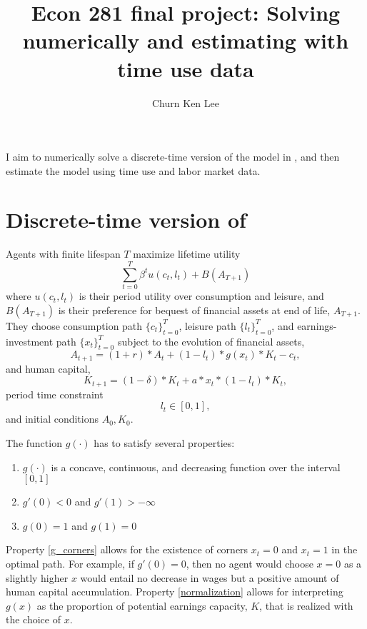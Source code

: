 \documentclass[12pt]{article}
\title{Econ 281 final project: Solving \textcite{blinder_weiss_1976_lifecycle_human_capital_labor_supply_synthesis} numerically and estimating with time use data}
\author{Churn Ken Lee}
\date{}
\begin{document}
\maketitle

I aim to numerically solve a discrete-time version of the model in \textcite{blinder_weiss_1976_lifecycle_human_capital_labor_supply_synthesis}, and then estimate the model using time use and labor market data.

\section{Discrete-time version of \textcite{blinder_weiss_1976_lifecycle_human_capital_labor_supply_synthesis}}
Agents with finite lifespan $T$ maximize lifetime utility
\begin{equation}
    \sum_{t=0}^{T} \beta^t u(c_t, l_t) + B(A_{T+1})
\end{equation}
where $u(c_t, l_t)$ is their period utility over consumption and leisure, and $B(A_{T+1})$ is their preference for bequest of financial assets at end of life, $A_{T+1}$.
They choose consumption path $\{ c_t \}_{t=0}^T $, leisure path $\{ l_t \}_{t=0}^T $, and earnings-investment path $\{ x_t \}_{t=0}^T $ subject to the evolution of financial assets,
\begin{equation}
    A_{t+1} = (1+r)*A_{t} + (1-l_{t})*g(x_t)*K_{t} - c_{t},
\end{equation}
and human capital,
\begin{equation}
    K_{t+1} = (1-\delta)*K_t + a*x_t*(1-l_t)*K_t,
\end{equation}
period time constraint
\begin{equation}
    l_t \in [0,1],
\end{equation}
and initial conditions $A_0, K_0$.

The function $g(\cdot)$ has to satisfy several properties:
\begin{enumerate}
    \item $g(\cdot)$ is a concave, continuous, and decreasing function over the interval $[0,1]$ \label{labor_market_eqm}
    \item $g'(0) < 0$ and $g'(1) > -\infty$ \label{g_corners}
    \item $g(0) = 1$ and $g(1) = 0$ \label{normalization}
\end{enumerate}
Property \ref{g_corners} allows for the existence of corners $x_t = 0$ and $x_t = 1$ in the optimal path.
For example, if $g'(0) = 0$, then no agent would choose $x = 0$ as a slightly higher $x$ would entail no decrease in wages but a positive amount of human capital accumulation.
Property \ref{normalization} allows for interpreting $g(x)$ as the proportion of potential earnings capacity, $K$, that is realized with the choice of $x$.
\end{document}
